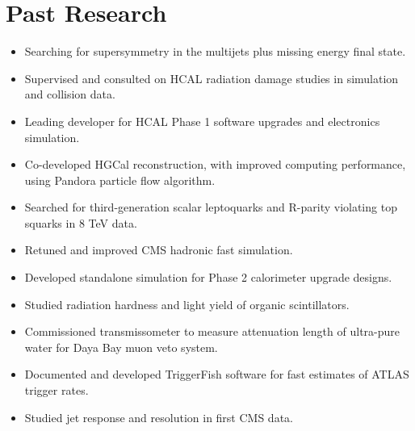 \section{Past Research}
\begin{itemize}[leftmargin=12pt]
\item Searching for supersymmetry in the multijets plus missing energy final state.
\item Supervised and consulted on HCAL radiation damage studies in simulation and collision data.
\item Leading developer for HCAL Phase 1 software upgrades and electronics simulation.
\item Co-developed HGCal reconstruction, with improved computing performance, using Pandora particle flow algorithm.
\item Searched for third-generation scalar leptoquarks and R-parity violating top squarks in 8 TeV data.
\item Retuned and improved CMS hadronic fast simulation.
\item Developed standalone simulation for Phase 2 calorimeter upgrade designs.
\item Studied radiation hardness and light yield of organic scintillators.
\item Commissioned transmissometer to measure attenuation length of ultra-pure water for Daya Bay muon veto system.
\item Documented and developed TriggerFish software for fast estimates of ATLAS trigger rates.
\item Studied jet response and resolution in first CMS data.
\end{itemize}
